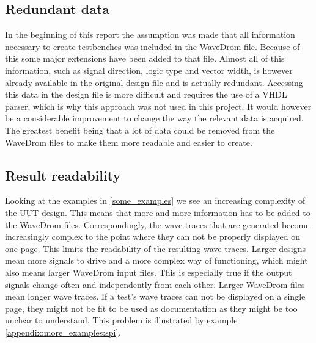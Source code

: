 \subsection{Redundant data}
In the beginning of this report the assumption was made that all information necessary to create testbenches was included in the WaveDrom file. Because of this some major extensions have been added to that file. Almost all of this information, such as signal direction, logic type and vector width, is however already available in the original design file and is actually redundant. Accessing this data in the design file is more difficult and requires the use of a VHDL parser, which is why this approach was not used in this project.
\npar
It would however be a considerable improvement to change the way the relevant data is acquired. The greatest benefit being that a lot of data could be removed from the WaveDrom files to make them more readable and easier to create.
\subsection{Result readability}
Looking at the examples in \ref{some_examples} we see an increasing complexity of the UUT design. This means that more and more information has to be added to the WaveDrom files. Correspondingly, the wave traces that are generated become increasingly complex to the point where they can not be properly displayed on one page. This limits the readability of the resulting wave traces. 
\npar
Larger designs mean more signals to drive and a more complex way of functioning, which might also means larger WaveDrom input files. This is especially true if the output signals change often and independently from each other. Larger WaveDrom files mean longer wave traces.
\npar
If a test's wave traces can not be displayed on a single page, they might not be fit to be used as documentation as they might be too unclear to understand. This problem is illustrated by example \ref{appendix:more_examples:spi}.\newpage
